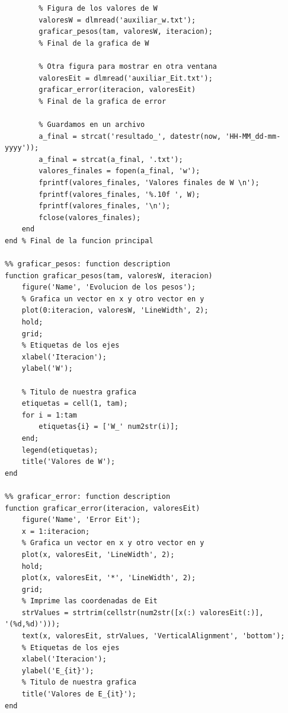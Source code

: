 \documentclass[12pt, titlepage]{article}
\begin{document}
\begin{lstlisting}
        % Figura de los valores de W
        valoresW = dlmread('auxiliar_w.txt');
        graficar_pesos(tam, valoresW, iteracion);
        % Final de la grafica de W
        
        % Otra figura para mostrar en otra ventana
        valoresEit = dlmread('auxiliar_Eit.txt');
        graficar_error(iteracion, valoresEit)
        % Final de la grafica de error
        
        % Guardamos en un archivo
        a_final = strcat('resultado_', datestr(now, 'HH-MM_dd-mm-yyyy'));
        a_final = strcat(a_final, '.txt');
        valores_finales = fopen(a_final, 'w');
        fprintf(valores_finales, 'Valores finales de W \n');
        fprintf(valores_finales, '%.10f ', W);
        fprintf(valores_finales, '\n');
        fclose(valores_finales);
    end
end % Final de la funcion principal
    
%% graficar_pesos: function description
function graficar_pesos(tam, valoresW, iteracion)
    figure('Name', 'Evolucion de los pesos');
    % Grafica un vector en x y otro vector en y
    plot(0:iteracion, valoresW, 'LineWidth', 2); 
    hold;
    grid;
    % Etiquetas de los ejes
    xlabel('Iteracion');
    ylabel('W');
    
    % Titulo de nuestra grafica
    etiquetas = cell(1, tam);
    for i = 1:tam
        etiquetas{i} = ['W_' num2str(i)];
    end;
    legend(etiquetas);
    title('Valores de W');
end

%% graficar_error: function description
function graficar_error(iteracion, valoresEit)
    figure('Name', 'Error Eit');
    x = 1:iteracion;
    % Grafica un vector en x y otro vector en y
    plot(x, valoresEit, 'LineWidth', 2);
    hold;
    plot(x, valoresEit, '*', 'LineWidth', 2);
    grid;
    % Imprime las coordenadas de Eit
    strValues = strtrim(cellstr(num2str([x(:) valoresEit(:)], '(%d,%d)')));
    text(x, valoresEit, strValues, 'VerticalAlignment', 'bottom');
    % Etiquetas de los ejes
    xlabel('Iteracion');
    ylabel('E_{it}');
    % Titulo de nuestra grafica
    title('Valores de E_{it}');
end


\end{lstlisting}
\end{document}
